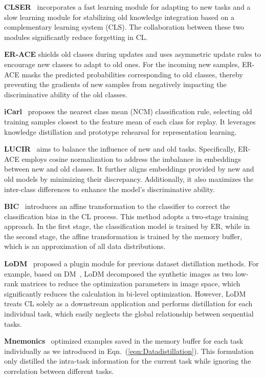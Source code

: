 \documentclass[table, xcdraw]{article}
\theoremstyle{plain}
\theoremstyle{definition}
\theoremstyle{remark}
\begin{document}
\textbf{CLSER}~\cite{clser}
incorporates a fast learning module for adapting to new tasks and a slow learning module for stabilizing old knowledge integration based on a complementary learning system (CLS). The collaboration between these two modules significantly reduce forgetting in CL.

\textbf{ER-ACE}\cite{ERACE} shields old classes during updates and uses asymmetric update rules to encourage new classes to adapt to old ones.
For the incoming new samples, ER-ACE masks the predicted probabilities corresponding to old classes, thereby preventing the gradients of new samples from negatively impacting the discriminative ability of the old classes.

\textbf{iCarl}~\cite{icarl} proposes the nearest class mean (NCM) classification rule, selecting old training samples closest to the feature mean of each class for replay. It leverages knowledge distillation and prototype rehearsal for representation learning.

\textbf{LUCIR}~\cite{LUCIR}
aims to balance the influence of new and old tasks. Specifically, ER-ACE employs cosine normalization to address the imbalance in embeddings between new and old classes. It further aligns embeddings provided by new and old models by minimizing their discrepancy. Additionally, it also maximizes the inter-class differences to enhance the model's discriminative ability.


\textbf{BIC}~\cite{BIC} 
introduces an affine transformation to the classifier to correct the classification bias in the CL process. This method adopts a two-stage training approach. In the first stage, the classification model is trained by ER, while in the second stage, the affine transformation is trained by the memory buffer, which is an approximation of all data distributions.

\textbf{LoDM}~\cite{LoDM} proposed a plugin module for previous dataset distillation methods. For example, based on DM~\cite{DMzhao2023dataset}, LoDM decomposed the synthetic images as two low-rank matrices to reduce the optimization parameters in image space, which significantly reduces the calculation in bi-level optimization. However, LoDM treats CL solely as a downstream application and performs distillation for each individual task, which easily neglects the global relationship between sequential tasks.

\textbf{Mnemonics}~\cite{liu2020mnemonics} optimized examples saved in the memory buffer for each task individually as we introduced in Eqn.~(\ref{eqn:Datadistillation}). This formulation only distilled the intra-task information for the current task while ignoring the correlation between different tasks. 
\end{document}
